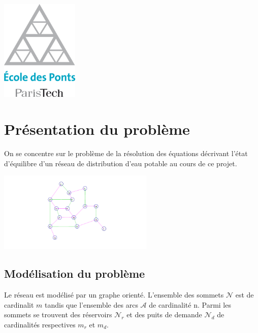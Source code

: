 \begin{titlepage}

\includegraphics[width=10em]{header_logo.png}\\[1cm] %
 

\vfill %

\end{titlepage}

\section{Présentation du problème}

On se concentre sur le problème de la résolution des équations décrivant l'état d'équilibre d'un réseau de distribution d'eau potable au cours de ce projet.

\begin{center}
  \includegraphics[width=20em]{reseau.png}
\end{center}

\subsection{Modélisation du problème}

Le réseau est modélisé par un graphe orienté. L'ensemble des sommets $\mathcal{N}$ est de cardinalit $m$ tandis que l'ensemble des arcs $\mathcal{A}$ de cardinalité n. Parmi les sommets se trouvent des réservoirs $\mathcal{N}_r$ et des puits de demande $\mathcal{N}_d$ de cardinalités respectives $m_r$ et $m_d$.

